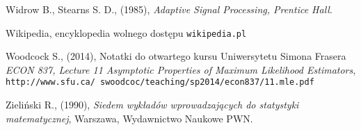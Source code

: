 \begin{thebibliography}{99}
 Widrow B., Stearns S. D., (1985), \textit{Adaptive Signal Processing, Prentice Hall}.

 Wikipedia, encyklopedia wolnego dostępu \texttt{wikipedia.pl}

  Woodcock S., (2014), Notatki do otwartego kursu Uniwersytetu Simona Frasera \textit{ECON 837, Lecture 11 Asymptotic Properties of Maximum Likelihood Estimators}, \\ \texttt{http://www.sfu.ca/~swoodcoc/teaching/sp2014/econ837/11.mle.pdf}

 Zieliński R., (1990), \textit{Siedem wykładów wprowadzających do statystyki matematycznej}, Warszawa, Wydawnictwo Naukowe PWN.


\end{thebibliography}
